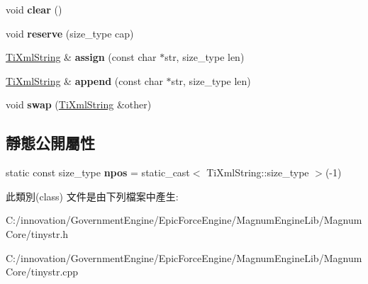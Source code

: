 \begin{DoxyCompactItemize}
\item 
void {\bfseries clear} ()\hypertarget{class_ti_xml_string_ab20e06e4c666abf3bdbfb3a1191d4888}{}\label{class_ti_xml_string_ab20e06e4c666abf3bdbfb3a1191d4888}

\item 
void {\bfseries reserve} (size\+\_\+type cap)\hypertarget{class_ti_xml_string_a88ecf9f0f00cb5c67b6b637958d7049c}{}\label{class_ti_xml_string_a88ecf9f0f00cb5c67b6b637958d7049c}

\item 
\hyperlink{class_ti_xml_string}{Ti\+Xml\+String} \& {\bfseries assign} (const char $\ast$str, size\+\_\+type len)\hypertarget{class_ti_xml_string_ac72f3d9149b7812c1e6c59402014d0d5}{}\label{class_ti_xml_string_ac72f3d9149b7812c1e6c59402014d0d5}

\item 
\hyperlink{class_ti_xml_string}{Ti\+Xml\+String} \& {\bfseries append} (const char $\ast$str, size\+\_\+type len)\hypertarget{class_ti_xml_string_ad44b21700d2ec24a511367b222b643fb}{}\label{class_ti_xml_string_ad44b21700d2ec24a511367b222b643fb}

\item 
void {\bfseries swap} (\hyperlink{class_ti_xml_string}{Ti\+Xml\+String} \&other)\hypertarget{class_ti_xml_string_aa392cbc180752a79f007f4f9280c7762}{}\label{class_ti_xml_string_aa392cbc180752a79f007f4f9280c7762}

\end{DoxyCompactItemize}
\subsection*{靜態公開屬性}
\begin{DoxyCompactItemize}
\item 
static const size\+\_\+type {\bfseries npos} = static\+\_\+cast$<$ Ti\+Xml\+String\+::size\+\_\+type $>$(-\/1)\hypertarget{class_ti_xml_string_a8f4422d227088dc7bec96f479b275d0a}{}\label{class_ti_xml_string_a8f4422d227088dc7bec96f479b275d0a}

\end{DoxyCompactItemize}


此類別(class) 文件是由下列檔案中產生\+:\begin{DoxyCompactItemize}
\item 
C\+:/innovation/\+Government\+Engine/\+Epic\+Force\+Engine/\+Magnum\+Engine\+Lib/\+Magnum\+Core/tinystr.\+h\item 
C\+:/innovation/\+Government\+Engine/\+Epic\+Force\+Engine/\+Magnum\+Engine\+Lib/\+Magnum\+Core/tinystr.\+cpp\end{DoxyCompactItemize}
